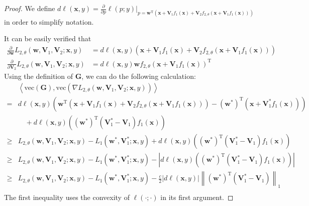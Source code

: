 \documentclass{article}
\theoremstyle{plain}
\theoremstyle{definition}
\newcommand{\norm}[1]{\left\lVert#1\right\rVert}
\newcommand{\abs}[1]{\left|#1\right|}
\newcommand{\dis}{\displaystyle}
\newcommand{\iprod}[2]{\left\langle #1,#2 \right\rangle}
\begin{document}
\begin{proof}
    We define $d\ell(\mathbf{x},y)=\dis\frac{\partial}{\partial p}\ell(p;y)
    \bigg|_{p=\mathbf{w}^\mathrm{T}(\mathbf{x}+\mathbf{V}_1f_1(\mathbf{x})+\mathbf{V}_2f_{2,\theta}(\mathbf{x}+\mathbf{V}_1f_1(\mathbf{x})))}$ in order to simplify notation.

    It can be easily verified that
    \begin{align*}
    \frac{\partial}{\partial\mathbf{w}}L_{2,\theta}(\mathbf{w},\mathbf{V}_1,\mathbf{V}_2;\mathbf{x},y)&=d\ell(\mathbf{x},y)(\mathbf{x}+\mathbf{V}_1f_1(\mathbf{x})+\mathbf{V}_2f_{2,\theta}(\mathbf{x}+\mathbf{V}_1f_1(\mathbf{x})))\\
        \frac{\partial}{\partial\mathbf{V}_2}L_{2,\theta}(\mathbf{w},\mathbf{V}_1,\mathbf{V}_2;\mathbf{x},y)&=d\ell(\mathbf{x},y)\mathbf{w}f_{2,\theta}(\mathbf{x}+\mathbf{V}_1f_1(\mathbf{x}))^\mathrm{T}
    \end{align*}
    Using the definition of $\mathbf{G}$, we can do the following calculation:
    \begin{align*}
    &\iprod{\text{vec}(\mathbf{G})}{\text{vec}\left(\nabla L_{2,\theta}(\mathbf{w},\mathbf{V}_1,\mathbf{V}_2;\mathbf{x},y)\right)}\\
        =&d\ell(\mathbf{x},y)\left(\mathbf{w}^\mathrm{T}(\mathbf{x}+\mathbf{V}_1f_1(\mathbf{x})+\mathbf{V}_2f_{2,\theta}(\mathbf{x}+\mathbf{V}_1f_1(\mathbf{x})))-\left(\mathbf{w}^*\right)^\mathrm{T}(\mathbf{x}+\mathbf{V}_1^*f_1(\mathbf{x}))\right)\\
        &\quad +d\ell(\mathbf{x},y)\left(\left(\mathbf{w}^*\right)^\mathrm{T}\left(\mathbf{V}_1^*-\mathbf{V}_1\right)f_1(\mathbf{x})\right)\\
    \geq &L_{2,\theta}(\mathbf{w},\mathbf{V}_1,\mathbf{V}_2;\mathbf{x},y)-L_1(\mathbf{w}^*,\mathbf{V}_1^*;\mathbf{x},y)
        +d\ell(\mathbf{x},y)\left(\left(\mathbf{w}^*\right)^\mathrm{T}\left(\mathbf{V}_1^*-\mathbf{V}_1\right)f_1(\mathbf{x})\right)\\
    \geq &L_{2,\theta}(\mathbf{w},\mathbf{V}_1,\mathbf{V}_2;\mathbf{x},y)-L_1(\mathbf{w}^*,\mathbf{V}_1^*;\mathbf{x},y)
        -\abs{d\ell(\mathbf{x},y)\left(\left(\mathbf{w}^*\right)^\mathrm{T}\left(\mathbf{V}_1^*-\mathbf{V}_1\right)f_1(\mathbf{x})\right)}\\
    \geq &L_{2,\theta}(\mathbf{w},\mathbf{V}_1,\mathbf{V}_2;\mathbf{x},y)-L_1(\mathbf{w}^*,\mathbf{V}_1^*;\mathbf{x},y)
        -\frac c 2\abs{d\ell(\mathbf{x},y)}\norm{\left(\mathbf{w}^*\right)^\mathrm{T}\left(\mathbf{V}_1^*-\mathbf{V}_1\right)}_1\\
    \end{align*}
    The first inequality uses the convexity of $\ell(\cdot;\cdot)$ in its first argument.


\end{proof}
\end{document}
